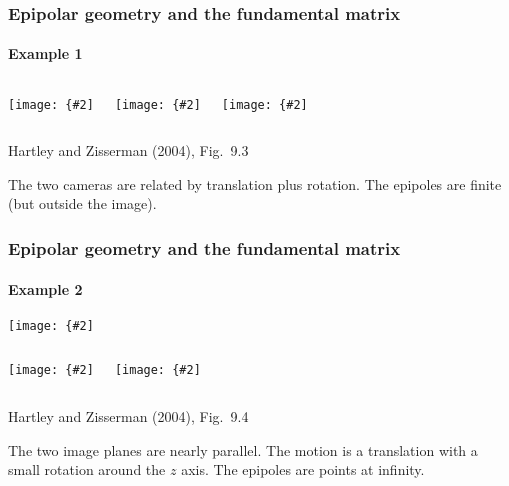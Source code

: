 \documentclass[aspectratio=169]{beamer}
\newcommand{\myfig}[3]{\centerline{\texttt{[image: \{\#2]}}}
    \centerline{\scriptsize #3}}
\begin{document}
\begin{frame}
\frametitle{Epipolar geometry and the fundamental matrix}
\framesubtitle{Example 1}

\begin{columns}
\column{1.5in}
\myfig{1.4in}{HZ-fig8-3a}{\parbox{1.4in}{Example camera setup
with \alert{converging} cameras}}
\column{1.5in}
\myfig{1.4in}{HZ-fig8-3b}{\parbox{1.4in}{Left image, with points and
epipolar lines}}
\column{1.5in}
\myfig{1.4in}{HZ-fig8-3c}{\parbox{1.4in}{Right image, with
corresponding points/lines}}
\end{columns}

\medskip

\centerline{\scriptsize Hartley and Zisserman (2004), Fig.\ 9.3}

\medskip

The two cameras are related by \alert{translation plus rotation}.  The
epipoles are \alert{finite} (but outside the image).

\end{frame}

\begin{frame}
\frametitle{Epipolar geometry and the fundamental matrix}
\framesubtitle{Example 2}

\medskip

\myfig{3.3in}{HZ-fig8-4a}{Example camera setup with
    \alert{parallel} cameras}

\medskip

\begin{columns}
\column{2in}
\myfig{1.9in}{HZ-fig8-4b}{\parbox{1.9in}{Left image, with some
sample epipolar lines}}
\column{2in}
\myfig{1.9in}{HZ-fig8-4c}{\parbox{1.9in}{Right image, with
corresponding epipolar lines}}
\end{columns}

\medskip

\centerline{\scriptsize Hartley and Zisserman (2004), Fig.\ 9.4}

\medskip

The two image planes are nearly \alert{parallel}.  The motion is a
\alert{translation} with a small rotation around the $z$ axis.  The
epipoles are points at infinity.

\end{frame}
\end{document}
